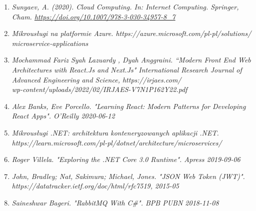 \begin{enumerate}
\item {\textit{Sunyaev, A. (2020). Cloud Computing. In: Internet Computing. Springer, Cham. \url{https://doi.org/10.1007/978-3-030-34957-8_7}}}
\item {\textit {Mikrousługi na platformie Azure.  https://azure.microsoft.com/pl-pl/solutions/\\microservice-applications}}
\item {\textit {Mochammad Fariz Syah Lazuardy
, Dyah Anggraini. “Modern Front End Web Architectures with React.Js
and Next.Js" International Research Journal of Advanced Engineering and Science, https://irjaes.com/\\wp-content/uploads/2022/02/IRJAES-V7N1P162Y22.pdf}}
\item {\textit {Alex Banks, Eve Porcello. "Learning React: Modern Patterns for Developing React Apps". O'Reilly 2020-06-12}}
\item {\textit {Mikrousługi .NET: architektura konteneryzowanych aplikacji .NET. \\ https://learn.microsoft.com/pl-pl/dotnet/architecture/microservices/}}
\item {\textit{Roger Villela. "Exploring the .NET Core 3.0 Runtime". Apress 2019-09-06}}
\item {\textit {John, Bradley; Nat, Sakimura; Michael, Jones. "JSON Web Token (JWT)". https://datatracker.ietf.org/doc/html/rfc7519, 2015-05}}
\item {\textit {Saineshwar Bageri. "RabbitMQ With C\#". BPB PUBN 2018-11-08}}

\end{enumerate}